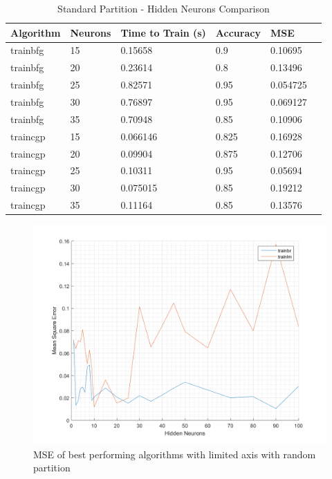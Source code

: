 \documentclass[a4paper, 10pt, conference]{ieeeconf}
\begin{document}
\begin{table}
\centering
\caption{Standard Partition - Hidden Neurons Comparison}
\label{tbl:unmixed}
\begin{tabular}{llllll}
\hline
\textbf{Algorithm} & \textbf{Neurons} & \textbf{Time to Train (s)} & \textbf{Accuracy} & \textbf{MSE} \\ \hline
trainbfg & 15 & 0.15658 & 0.9 & 0.10695 \\ \hline 
trainbfg & 20 & 0.23614 & 0.8 & 0.13496 \\ \hline 
trainbfg & 25 & 0.82571 & 0.95 & 0.054725 \\ \hline 
trainbfg & 30 & 0.76897 & 0.95 & 0.069127 \\ \hline 
trainbfg & 35 & 0.70948 & 0.85 & 0.10906 \\ \hline

traincgp & 15 & 0.066146 & 0.825 & 0.16928 \\ \hline 
traincgp & 20 & 0.09904 & 0.875 & 0.12706 \\ \hline 
traincgp & 25 & 0.10311 & 0.95 & 0.05694 \\ \hline 
traincgp & 30 & 0.075015 & 0.85 & 0.19212 \\ \hline 
traincgp & 35 & 0.11164 & 0.85 & 0.13576 \\ \hline 
\end{tabular}
\end{table}

\begin{figure}[!ht]
    \centering
    \includegraphics[width=\linewidth]{pic/mixed_best_limited.png}
    \caption{MSE of best performing algorithms with limited axis with random partition}
    \label{fig:mixed_limited}
\end{figure}
\end{document}
